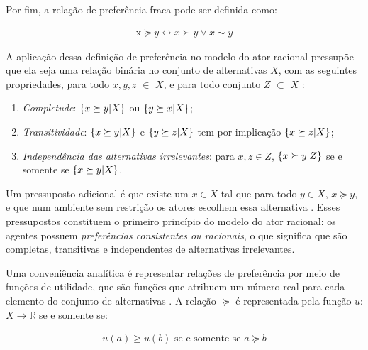 Por fim, a relação de preferência fraca pode ser definida como:

\begin{align*}
  \text{x} \succeq y \leftrightarrow x \succ y \lor x \sim y
\end{align*}

A aplicação dessa definição de preferência no modelo do ator racional pressupõe
que ela seja uma relação binária no conjunto de alternativas \(X\), com as
seguintes propriedades, para todo \(x,y,z\) $\in$ \(X\), e para todo conjunto
\(Z\) $\subset$ \(X\) \cite{gintis2016individuality,
  binmore2008rational}:



\begin{enumerate}
\item \textit{Completude}: \(\{ x \succeq y | \vspace{0.4cm} X \}\) ou \(\{ y \succeq x |
  \vspace{0.4cm} X \}\);
\item \textit{Transitividade}: \( \{x \succeq y | \vspace{0.4cm} X\} \) e \(\{y \succeq z |
  \vspace{0.4cm} X \}\) tem por implicação \(\{x \succeq z | \vspace{0.4cm} X\}\);
\item \textit{Independência das alternativas irrelevantes}: para \(x,z \in Z\),
  \(\{x \succeq y | \vspace{0.4cm} Z \}\) se e somente se \(\{x \succeq y | \vspace{0.4cm}
  X\}\).
\end{enumerate}

Um pressuposto adicional é que existe um \(x \in X\) tal que para todo \(y \in X\),
\(x \succeq y\), e que num ambiente sem restrição os atores escolhem essa alternativa
\cite{gintis2009bounds}. Esses pressupostos constituem o primeiro princípio do
modelo do ator racional: os agentes possuem \textit{preferências consistentes ou
racionais}, o que significa que são completas, transitivas e independentes de
alternativas irrelevantes.

Uma conveniência analítica é representar relações de preferência por meio de
funções de utilidade, que são funções que atribuem um número real para cada
elemento do conjunto de alternativas \cite{sep-preferences}. A relação \( \succeq\) é
representada pela função \(u\): \(X \longrightarrow \mathbb{R}\) se e somente se:

\begin{align*}
  u(a) \geq u(b)
  \text{ se e somente se }
  a \succeq b
\end{align*}

